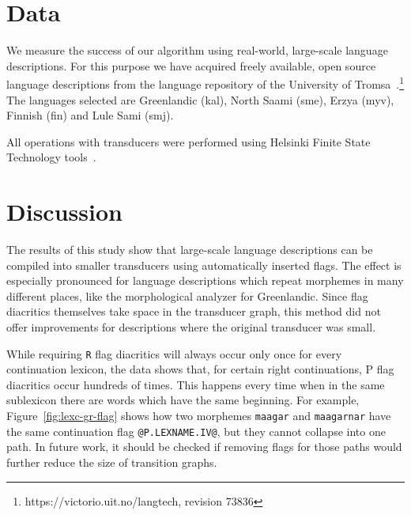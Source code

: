 \documentclass[10pt, a4paper]{article}
\begin{document}

\section{Data}
\label{sec:data}

We measure the success of our algorithm using real-world, large-scale
language descriptions. For this purpose we have acquired freely
available, open source language descriptions from the language repository of the University of 
Tromsa~\cite{moshagen2013building}.\footnote{https://victorio.uit.no/langtech, revision 73836} The
languages selected are Greenlandic (kal), North Saami (sme), Erzya
(myv), Finnish (fin) and Lule Sami (smj).

All operations with transducers were performed using Helsinki Finite
State Technology tools~\cite{linden2011}.



\section{Discussion}
\label{sec:discussion}

The results of this study show that large-scale language descriptions
can be compiled into smaller transducers using automatically inserted
flags. The effect is especially pronounced for language descriptions
which repeat morphemes in many different places, like the
morphological analyzer for Greenlandic. Since flag diacritics
themselves take space in the transducer graph, this method did not
offer improvements for descriptions where the original
transducer was small.

While requiring {\tt R} flag diacritics will always occur only once
for every continuation lexicon, the data shows that, for
certain right continuations, P flag diacritics occur hundreds of
times. This happens every time when in the same sublexicon
there are words which have the same beginning. For example, Figure~\ref{fig:lexc-gr-flag} shows how two morphemes \texttt{maagar}
and \texttt{maagarnar} have the same continuation flag
\verb+@P.LEXNAME.IV@+, but they cannot collapse into one path. In future
work, it should be checked if removing flags for those paths would
further reduce the size of transition graphs.


\end{document}
